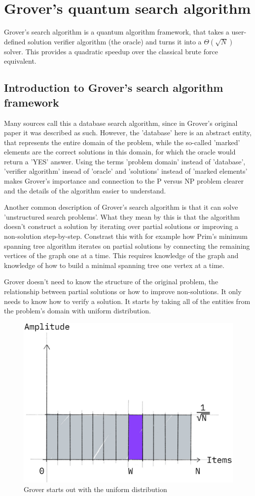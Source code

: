 \chapter{Grover's quantum search algorithm}

Grover's search algorithm\cite{GroverOriginal} is a quantum algorithm framework, that takes a user-defined solution verifier algorithm (the oracle) and turns it into a $\Theta(\sqrt{N})$\cite{bennett_strengths_1997} solver. This provides a quadratic speedup over the classical brute force equivalent.

\section{Introduction to Grover's search algorithm framework}

Many sources call this a database search algorithm, since in Grover's original paper it was described as such. However, the 'database' here is an abstract entity, that represents the entire domain of the problem, while the so-called 'marked' elements are the correct solutions in this domain, for which the oracle would return a 'YES' answer. Using the terms 'problem domain' instead of 'database', 'verifier algorithm' insead of 'oracle' and 'solutions' instead of 'marked elements' makes Grover's importance and connection to the P versus NP problem clearer and the details of the algorithm easier to understand.

Another common description of Grover's search algorithm is that it can solve 'unstructured search problems'. What they mean by this is that the algorithm doesn't construct a solution by iterating over partial solutions or improving a non-solution step-by-step. Constrast this with for example how Prim's minimum spanning tree algorithm iterates on partial solutions by connecting the remaining vertices of the graph one at a time. This requires knowledge of the graph and knowledge of how to build a minimal spanning tree one vertex at a time.

Grover doesn't need to know the structure of the original problem, the relationship between partial solutions or how to improve non-solutions. It only needs to know how to verify a solution. It starts by taking all of the entities from the problem's domain with uniform distribution.

\begin{figure}[H]
    \centering
    \includegraphics[width=0.5\linewidth]{content/assets/03_grovers_algorithm/grover_uniform.jpg}
    \caption{Grover starts out with the uniform distribution\cite{GroverQiskitTextbook}}
\end{figure}

